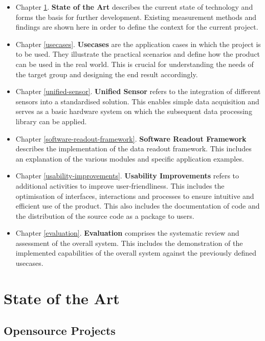 \begin{itemize}
\item
  Chapter \ref{state-of-the-art}. \textbf{State of the Art} describes
  the current state of technology and forms the basis for further
  development. Existing measurement methods and findings are shown here
  in order to define the context for the current project.
\item
  Chapter \ref{usecases}. \textbf{Usecases} are the application cases in
  which the project is to be used. They illustrate the practical
  scenarios and define how the product can be used in the real world.
  This is crucial for understanding the needs of the target group and
  designing the end result accordingly.
\item
  Chapter \ref{unified-sensor}. \textbf{Unified Sensor} refers to the
  integration of different sensors into a standardised solution. This
  enables simple data acquisition and serves as a basic hardware system
  on which the subsequent data processing library can be applied.
\item
  Chapter \ref{software-readout-framework}. \textbf{Software Readout
  Framework} describes the implementation of the data readout framework.
  This includes an explanation of the various modules and specific
  application examples.
\item
  Chapter \ref{usability-improvements}. \textbf{Usability Improvements}
  refers to additional activities to improve user-friendliness. This
  includes the optimisation of interfaces, interactions and processes to
  ensure intuitive and efficient use of the product. This also includes
  the documentation of code and the distribution of the source code as a
  package to users.
\item
  Chapter \ref{evaluation}. \textbf{Evaluation} comprises the systematic
  review and assessment of the overall system. This includes the
  demonstration of the implemented capabilities of the overall system
  against the previously defined usecases.
\end{itemize}

\hypertarget{state-of-the-art}{%
\chapter{State of the Art}\label{state-of-the-art}}

\hypertarget{opensource-projects}{%
\section{Opensource Projects}\label{opensource-projects}}

